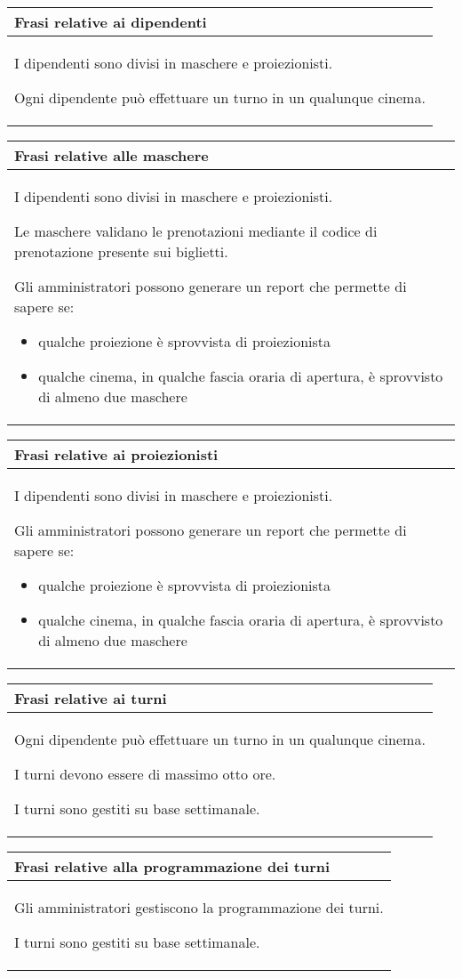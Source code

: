 \begin{tabularx}{\linewidth}{|X|}
    \hline
    \rowcolor{tblhdrcolor}
    \textbf{Frasi relative ai dipendenti} \\\hline
    I dipendenti sono divisi in maschere e proiezionisti.

    Ogni dipendente può effettuare un turno in un qualunque cinema.
    \\ \hline
\end{tabularx}

\begin{tabularx}{\linewidth}{|X|}
    \hline
    \rowcolor{tblhdrcolor}
    \textbf{Frasi relative alle maschere} \\\hline
    I dipendenti sono divisi in maschere e proiezionisti.

    Le maschere validano le prenotazioni mediante il codice
    di prenotazione presente sui biglietti.

    Gli amministratori possono generare un report che permette di
    sapere se:
    \begin{itemize}
        \item qualche proiezione è sprovvista di proiezionista
        \item qualche cinema, in qualche fascia oraria di apertura,
              è sprovvisto di almeno due maschere
    \end{itemize}
    \\ \hline
\end{tabularx}

\begin{tabularx}{\linewidth}{|X|}
    \hline
    \rowcolor{tblhdrcolor}
    \textbf{Frasi relative ai proiezionisti} \\\hline
    I dipendenti sono divisi in maschere e proiezionisti.

    Gli amministratori possono generare un report che permette di
    sapere se:
    \begin{itemize}
        \item qualche proiezione è sprovvista di proiezionista
        \item qualche cinema, in qualche fascia oraria di apertura,
              è sprovvisto di almeno due maschere
    \end{itemize}
    \\ \hline
\end{tabularx}

\begin{tabularx}{\linewidth}{|X|}
    \hline
    \rowcolor{tblhdrcolor}
    \textbf{Frasi relative ai turni} \\\hline
    Ogni dipendente può effettuare un turno in un qualunque cinema.

    I turni devono essere di massimo otto ore.

    I turni sono gestiti su base settimanale.
    \\ \hline
\end{tabularx}

\begin{tabularx}{\linewidth}{|X|}
    \hline
    \rowcolor{tblhdrcolor}
    \textbf{Frasi relative alla programmazione dei turni} \\\hline
    Gli amministratori gestiscono la programmazione dei turni.

    I turni sono gestiti su base settimanale.
    \\ \hline
\end{tabularx}
